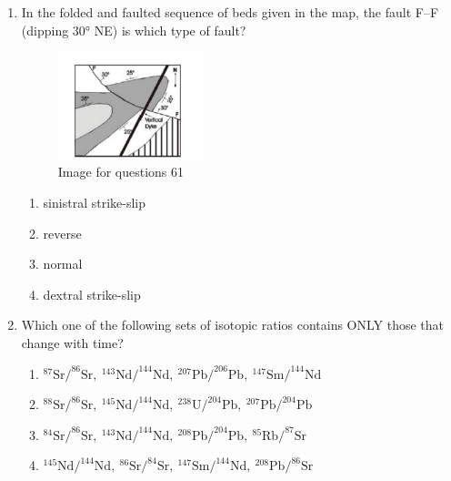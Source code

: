 \documentclass[journal,12pt,onecolumn]{IEEEtran}
\theoremstyle{remark}
\begin{document}
\begin{enumerate}
\item In the folded and faulted sequence of beds given in the map, the fault F--F (dipping 30° NE) is which type of fault?  

\begin{figure}[H]
    \centering
    \includegraphics[width=0.4\textwidth]{figs/fig14.png}
    \caption{Image for questions 61}
    \label{fig:question61}
\end{figure}




\begin{multicols}{2}
\begin{enumerate}
\item sinistral strike-slip  
\item reverse  
\item normal  
\item dextral strike-slip  
\end{enumerate}
\end{multicols}

\item Which one of the following sets of isotopic ratios contains ONLY those that change with time?


\begin{enumerate}
\item \ensuremath{^{87}\text{Sr}/^{86}\text{Sr},\ \allowbreak ^{143}\text{Nd}/^{144}\text{Nd},\ \allowbreak ^{207}\text{Pb}/^{206}\text{Pb},\ \allowbreak ^{147}\text{Sm}/^{144}\text{Nd}}  
\item \ensuremath{^{88}\text{Sr}/^{86}\text{Sr},\ \allowbreak ^{145}\text{Nd}/^{144}\text{Nd},\ \allowbreak ^{238}\text{U}/^{204}\text{Pb},\ \allowbreak ^{207}\text{Pb}/^{204}\text{Pb}}  
\item \ensuremath{^{84}\text{Sr}/^{86}\text{Sr},\ \allowbreak ^{143}\text{Nd}/^{144}\text{Nd},\ \allowbreak ^{208}\text{Pb}/^{204}\text{Pb},\ \allowbreak ^{85}\text{Rb}/^{87}\text{Sr}}  
\item \ensuremath{^{145}\text{Nd}/^{144}\text{Nd},\ \allowbreak ^{86}\text{Sr}/^{84}\text{Sr},\ \allowbreak ^{147}\text{Sm}/^{144}\text{Nd},\ \allowbreak ^{208}\text{Pb}/^{86}\text{Sr}}  
\end{enumerate}



\end{enumerate}
\end{document}
